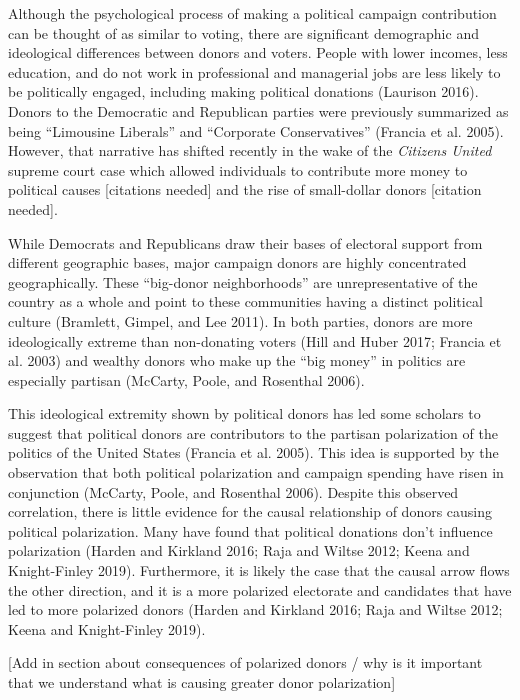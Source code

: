 \documentclass[12pt,]{article}
\begin{document}
Although the psychological process of making a political campaign
contribution can be thought of as similar to voting, there are
significant demographic and ideological differences between donors and
voters. People with lower incomes, less education, and do not work in
professional and managerial jobs are less likely to be politically
engaged, including making political donations (Laurison 2016). Donors to
the Democratic and Republican parties were previously summarized as
being ``Limousine Liberals'' and ``Corporate Conservatives'' (Francia et
al. 2005). However, that narrative has shifted recently in the wake of
the \emph{Citizens United} supreme court case which allowed individuals
to contribute more money to political causes {[}citations needed{]} and
the rise of small-dollar donors {[}citation needed{]}.

While Democrats and Republicans draw their bases of electoral support
from different geographic bases, major campaign donors are highly
concentrated geographically. These ``big-donor neighborhoods'' are
unrepresentative of the country as a whole and point to these
communities having a distinct political culture (Bramlett, Gimpel, and
Lee 2011). In both parties, donors are more ideologically extreme than
non-donating voters (Hill and Huber 2017; Francia et al. 2003) and
wealthy donors who make up the ``big money'' in politics are especially
partisan (McCarty, Poole, and Rosenthal 2006).

This ideological extremity shown by political donors has led some
scholars to suggest that political donors are contributors to the
partisan polarization of the politics of the United States (Francia et
al. 2005). This idea is supported by the observation that both political
polarization and campaign spending have risen in conjunction (McCarty,
Poole, and Rosenthal 2006). Despite this observed correlation, there is
little evidence for the causal relationship of donors causing political
polarization. Many have found that political donations don't influence
polarization (Harden and Kirkland 2016; Raja and Wiltse 2012; Keena and
Knight-Finley 2019). Furthermore, it is likely the case that the causal
arrow flows the other direction, and it is a more polarized electorate
and candidates that have led to more polarized donors (Harden and
Kirkland 2016; Raja and Wiltse 2012; Keena and Knight-Finley 2019).

{[}Add in section about consequences of polarized donors / why is it
important that we understand what is causing greater donor
polarization{]}
\end{document}
